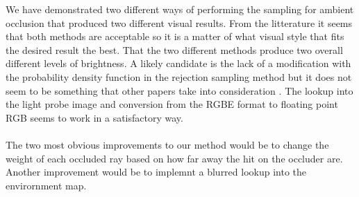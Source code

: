 We have demonstrated two different ways of performing the sampling for ambient occlusion that produced two different visual results. From the litterature it seems that both methods are acceptable so it is a matter of what visual style that fits the desired result the best. That the two different methods produce two overall different levels of brightness. A likely candidate is the lack of a modification with the probability density function in the rejection sampling method but it does not seem to be something that other papers take into consideration \cite{Gems17}. The lookup into the light probe image and conversion from the RGBE format to floating point RGB seems to work in a satisfactory way.
\\ \\
The two most obvious improvements to our method would be to change the weight of each occluded ray based on how far away the hit on the occluder are. Another improvement would be to implemnt a blurred lookup into the envirornment map.